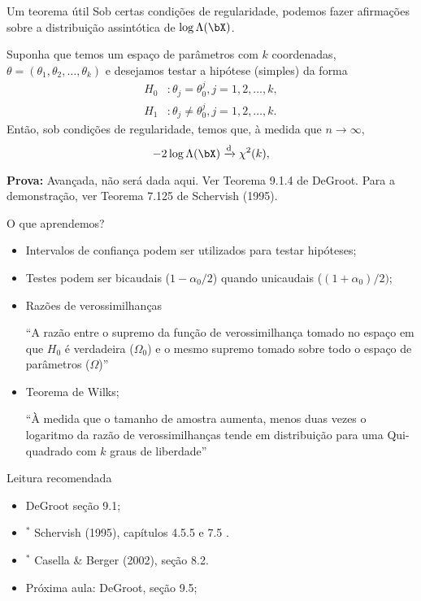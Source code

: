 \begin{frame}{Um teorema útil}
 Sob certas condições de regularidade, podemos fazer afirmações sobre a distribuição assintótica de $\log\Lambda(\bX)$.
 \begin{theo}
 \label{thm:Wilks}
  Suponha que temos um espaço de parâmetros com $k$ coordenadas, $\theta = (\theta_1, \theta_2, \ldots, \theta_k)$ e desejamos testar a hipótese (simples) da forma
   \begin{align*}
   H_0 &:  \theta_j = \theta_0^{j}, j = 1, 2, \ldots, k, \\
   H_1 &:  \theta_j \neq \theta_0^{j}, j = 1, 2, \ldots, k. 
  \end{align*}
  Então, sob condições de regularidade, temos que, à medida que $n \to \infty$,
  \begin{equation*}
   -2\log\Lambda(\bX) \xrightarrow{\text{d}} \chi^{2} (k), 
  \end{equation*}
 \end{theo}
\textbf{Prova:} Avançada, não será dada aqui.
Ver Teorema 9.1.4 de DeGroot.
Para a demonstração, ver Teorema 7.125 de Schervish (1995).
\end{frame}

\begin{frame}{O que aprendemos?}
\begin{itemize}

  \item[\faLightbulbO] Intervalos de confiança podem ser utilizados para testar hipóteses;
  \item[\faLightbulbO] Testes podem ser bicaudais ($1-\alpha_0/2$) quando unicaudais ($(1 + \alpha_0)/2)$;
  \item[\faLightbulbO] Razões de verossimilhanças
  
  ``A razão entre o supremo da função de verossimilhança tomado no espaço em que $H_0$ é verdadeira ($\Omega_0$) e o mesmo supremo tomado sobre todo o espaço de parâmetros ($\Omega$)''
  
  \item[\faLightbulbO] Teorema de Wilks; 
  
  ``À medida que o tamanho de amostra aumenta, menos duas vezes o logaritmo da razão de verossimilhanças tende em distribuição para uma Qui-quadrado com $k$ graus de liberdade''
  \end{itemize}
 \end{frame}

\begin{frame}{Leitura recomendada}
\begin{itemize}
 \item[\faBook] DeGroot seção 9.1;
 \item[\faBook] $^\ast$ Schervish (1995), capítulos 4.5.5 e 7.5 .
 \item[\faBook] $^\ast$ Casella \& Berger (2002), seção 8.2.
 \item[\faForward] Próxima aula: DeGroot, seção 9.5;
 \end{itemize} 
\end{frame}
